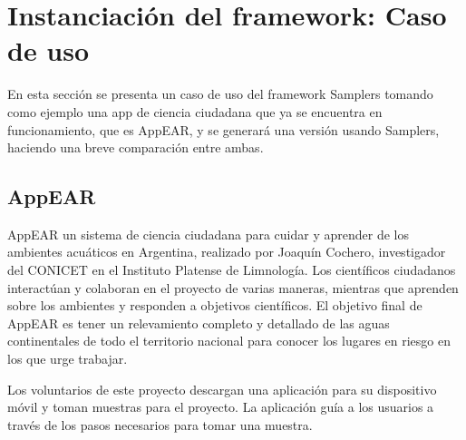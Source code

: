\chapter{Instanciación del framework: Caso de uso}\label{cap:caso_de_uso}

En esta sección se presenta un caso de uso del framework Samplers tomando como ejemplo una app de ciencia ciudadana que ya se encuentra en funcionamiento, que es AppEAR, y se generará una versión usando Samplers, haciendo una breve comparación entre ambas.

\section{AppEAR}
AppEAR un sistema de ciencia ciudadana para cuidar y aprender de los ambientes acuáticos en Argentina, realizado por Joaquín Cochero, investigador del CONICET en el Instituto Platense de Limnología. Los científicos ciudadanos interactúan y colaboran en el proyecto de varias maneras, mientras que aprenden sobre los ambientes y responden a objetivos científicos. El objetivo final de AppEAR es tener un relevamiento completo y detallado de las aguas continentales de todo el territorio nacional para conocer los lugares en riesgo en los que urge trabajar. 

Los voluntarios de este proyecto descargan una aplicación para su dispositivo móvil y toman muestras para el proyecto. La aplicación guía a los usuarios a través de los pasos necesarios para tomar una muestra.\cite{appEar}

